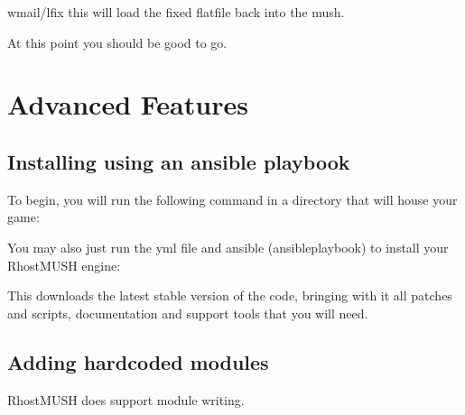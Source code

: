 \documentclass[letterpaper,10pt,english]{sphinxmanual}
\begin{document}
\sphinxAtStartPar
wmail/lfix  \sphinxhyphen{}\sphinxhyphen{} this will load the fixed flatfile back into the mush.

\sphinxAtStartPar
At this point you should be good to go.


\chapter{Advanced Features}
\label{\detokenize{advanced:advanced-features}}\label{\detokenize{advanced::doc}}

\section{Installing using an ansible playbook}
\label{\detokenize{advanced:installing-using-an-ansible-playbook}}\label{\detokenize{advanced:ansible-install}}
\sphinxAtStartPar
To begin, you will run the following command in a directory that will house your game:

\begin{sphinxVerbatim}[commandchars=\\\{\}]
   
\end{sphinxVerbatim}

\sphinxAtStartPar
You may also just run the yml file and ansible (ansible\sphinxhyphen{}playbook) to install your RhostMUSH engine:

\begin{sphinxVerbatim}[commandchars=\\\{\}]
 
 
\end{sphinxVerbatim}

\sphinxAtStartPar
This downloads the latest stable version of the code, bringing with it all patches and scripts, documentation and support tools that you will need.


\section{Adding hardcoded modules}
\label{\detokenize{advanced:adding-hardcoded-modules}}
\sphinxAtStartPar
RhostMUSH does support module writing.
\end{document}
